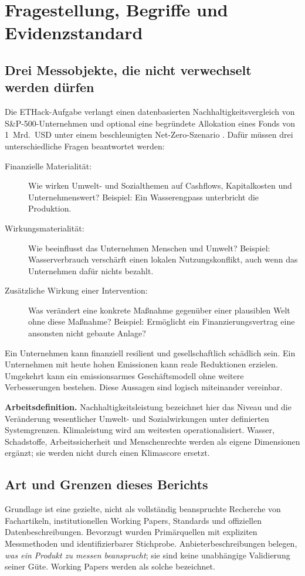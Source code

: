 \documentclass[11pt,a4paper]{article}
\begin{document}
\section{Fragestellung, Begriffe und Evidenzstandard}
\subsection{Drei Messobjekte, die nicht verwechselt werden dürfen}
Die ETHack-Aufgabe verlangt einen datenbasierten Nachhaltigkeitsvergleich von S\&P-500-Unternehmen und optional eine begründete Allokation eines Fonds von 1~Mrd.~USD unter einem beschleunigten Net-Zero-Szenario \cite{deck}. Dafür müssen drei unterschiedliche Fragen beantwortet werden:
\begin{description}
\item[Finanzielle Materialität:] Wie wirken Umwelt- und Sozialthemen auf Cashflows, Kapitalkosten und Unternehmenswert? Beispiel: Ein Wasserengpass unterbricht die Produktion.
\item[Wirkungsmaterialität:] Wie beeinflusst das Unternehmen Menschen und Umwelt? Beispiel: Wasserverbrauch verschärft einen lokalen Nutzungskonflikt, auch wenn das Unternehmen dafür nichts bezahlt.
\item[Zusätzliche Wirkung einer Intervention:] Was verändert eine konkrete Maßnahme gegenüber einer plausiblen Welt ohne diese Maßnahme? Beispiel: Ermöglicht ein Finanzierungsvertrag eine ansonsten nicht gebaute Anlage?
\end{description}
Ein Unternehmen kann finanziell resilient und gesellschaftlich schädlich sein. Ein Unternehmen mit heute hohen Emissionen kann reale Reduktionen erzielen. Umgekehrt kann ein emissionsarmes Geschäftsmodell ohne weitere Verbesserungen bestehen. Diese Aussagen sind logisch miteinander vereinbar.

\textbf{Arbeitsdefinition.} Nachhaltigkeitsleistung bezeichnet hier das Niveau und die Veränderung wesentlicher Umwelt- und Sozialwirkungen unter definierten Systemgrenzen. Klimaleistung wird am weitesten operationalisiert. Wasser, Schadstoffe, Arbeitssicherheit und Menschenrechte werden als eigene Dimensionen ergänzt; sie werden nicht durch einen Klimascore ersetzt.

\subsection{Art und Grenzen dieses Berichts}
Grundlage ist eine gezielte, nicht als vollständig beanspruchte Recherche von Fachartikeln, institutionellen Working Papers, Standards und offiziellen Datenbeschreibungen. Bevorzugt wurden Primärquellen mit expliziten Messmethoden und identifizierbarer Stichprobe. Anbieterbeschreibungen belegen, \emph{was ein Produkt zu messen beansprucht}; sie sind keine unabhängige Validierung seiner Güte. Working Papers werden als solche bezeichnet.
\end{document}
